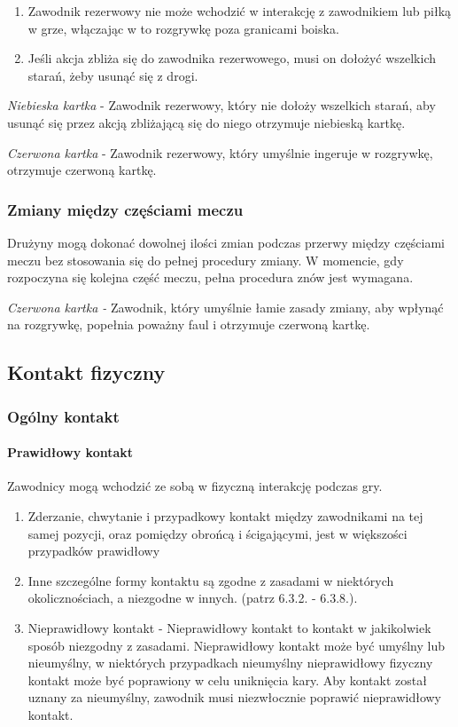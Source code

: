\documentclass[12pt]{article}
\begin{document}
\begin{enumerate}
	\item
	      Zawodnik rezerwowy nie może wchodzić w interakcję z zawodnikiem lub
	      piłką w grze, włączając w to rozgrywkę poza granicami boiska.
	\item
	      Jeśli akcja zbliża się do zawodnika rezerwowego, musi on dołożyć
	      wszelkich starań, żeby usunąć się z drogi.
\end{enumerate}

\emph{Niebieska kartka} - Zawodnik rezerwowy, który nie dołoży wszelkich
starań, aby usunąć się przez akcją zbliżającą się do niego otrzymuje
niebieską kartkę.

\emph{Czerwona kartka} - Zawodnik rezerwowy, który umyślnie ingeruje w
rozgrywkę, otrzymuje czerwoną kartkę.

\subsubsection{Zmiany między częściami meczu}

Drużyny mogą dokonać dowolnej ilości zmian podczas przerwy między
częściami meczu bez stosowania się do pełnej procedury zmiany. W
momencie, gdy rozpoczyna się kolejna część meczu, pełna procedura znów
jest wymagana.

\emph{Czerwona kartka -} Zawodnik, który umyślnie łamie zasady zmiany,
aby wpłynąć na rozgrywkę, popełnia poważny faul i otrzymuje czerwoną
kartkę.

\subsection{Kontakt fizyczny}

\subsubsection{Ogólny kontakt}

\paragraph{Prawidłowy kontakt}
Zawodnicy mogą wchodzić
ze sobą w fizyczną interakcję podczas gry.

\begin{enumerate}
	\item
	      Zderzanie, chwytanie i przypadkowy kontakt między zawodnikami na tej
	      samej pozycji, oraz pomiędzy obrońcą i ścigającymi, jest w większości
	      przypadków prawidłowy
	\item
	      Inne szczególne formy kontaktu są zgodne z zasadami w niektórych
	      okolicznościach, a niezgodne w innych. (patrz 6.3.2. - 6.3.8.).
	\item
	      Nieprawidłowy kontakt - Nieprawidłowy kontakt to kontakt w jakikolwiek
	      sposób niezgodny z zasadami. Nieprawidłowy kontakt może być umyślny
	      lub nieumyślny, w niektórych przypadkach nieumyślny nieprawidłowy
	      fizyczny kontakt może być poprawiony w celu uniknięcia kary. Aby
	      kontakt został uznany za nieumyślny, zawodnik musi niezwłocznie
	      poprawić nieprawidłowy kontakt.
\end{enumerate}
\end{document}
